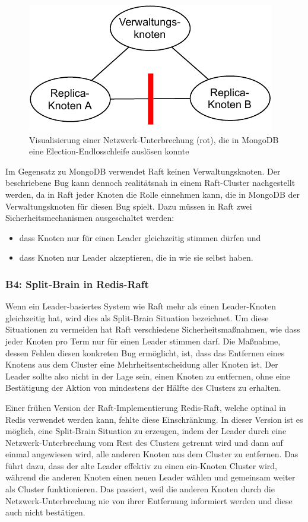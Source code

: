 \documentclass[12pt,a4paper]{report}
\begin{document}
\begin{figure}[H]
	\centering
	\includegraphics[width=0.6\linewidth]{img/ditm-Partitions.pdf}
	\caption{Visualisierung einer Netzwerk-Unterbrechung (rot), die in MongoDB eine Election-Endlosschleife auslösen konnte}
	\label{fig:partial_partition_mongo}
\end{figure}

Im Gegensatz zu MongoDB verwendet Raft keinen Verwaltungsknoten. Der beschriebene Bug kann dennoch realitätsnah in einem
Raft-Cluster nachgestellt werden, da in Raft jeder Knoten die Rolle einnehmen kann, die in MongoDB der Verwaltungsknoten für diesen
Bug spielt. Dazu müssen in Raft zwei Sicherheitsmechanismen ausgeschaltet werden:
\begin{itemize}
	\item dass Knoten nur für einen Leader gleichzeitig stimmen dürfen und
	\item dass Knoten nur Leader akzeptieren,  die in  wie sie selbst haben.
\end{itemize}

\subsubsection{B4: Split-Brain in Redis-Raft}
Wenn ein Leader-basiertes System wie Raft mehr als einen Leader-Knoten gleichzeitig hat, wird dies als Split-Brain Situation
bezeichnet. Um diese Situationen zu vermeiden hat Raft verschiedene Sicherheitsmaßnahmen, wie dass jeder Knoten pro Term nur für
einen Leader stimmen darf. Die Maßnahme, dessen Fehlen diesen konkreten Bug ermöglicht, ist, dass das Entfernen eines Knotens aus
dem Cluster eine Mehrheitsentscheidung aller Knoten ist. Der Leader sollte also nicht in der Lage sein, einen Knoten zu entfernen,
ohne eine Bestätigung der Aktion von mindestens der Hälfte des Clusters zu erhalten.

Einer frühen Version der Raft-Implementierung Redis-Raft, welche optinal in Redis verwendet werden kann, fehlte diese
Einschränkung. In dieser Version ist es möglich, eine Split-Brain Situation zu erzeugen, indem der Leader durch eine
Netzwerk-Unterbrechung vom Rest des Clusters getrennt wird und dann auf einmal angewiesen wird, alle anderen Knoten aus dem
Cluster zu entfernen. Das führt dazu, dass der alte Leader effektiv zu einen ein-Knoten Cluster wird, während die anderen Knoten
einen neuen Leader wählen und gemeinsam weiter als Cluster funktionieren. Das passiert, weil die anderen Knoten durch die
Netzwerk-Unterbrechung nie von ihrer Entfernung informiert werden und diese auch nicht bestätigen. \cite{jepsen_redis_raft}
\end{document}
